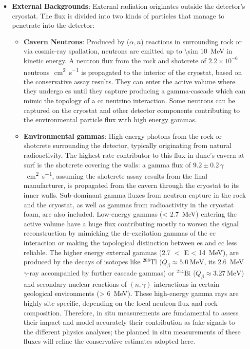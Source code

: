 \begin{itemize}
  \item\textbf{External Backgrounds}: External radiation originates outside the detector's cryostat. The flux is divided into two kinds of particles that manage to penetrate into the detector:

  \begin{itemize}
    \item\textbf{Cavern Neutrons}: Produced by (\(\alpha,n\)) reactions in surrounding rock or via cosmic-ray spallation, neutrons are emitted up to \SI{\sim 10}{\mega\electronvolt} in kinetic energy. A neutron flux from the rock and shotcrete of $2.2\times10^{-6}$\,neutrons\,\unit{\per\centi\meter\squared\per\second} is propagated to the interior of the cryostat, based on the conservative assay results. They can enter the active volume where they undergo \gls{es} until they capture producing a gamma-cascade which can mimic the topology of a \gls{cc} neutrino interaction. Some neutrons can be captured on the cryostat and other detector components contributing to the environmental particle flux with high energy gammas.
    \item\textbf{Environmental gammas}: High-energy photons from the rock or shotcrete surrounding the detector, typically originating from natural radioactivity. The highest rate contributor to this flux in \gls{dune}'s cavern at \gls{surf} is the shotcrete covering the walls: a gamma flux of $9.2\pm0.2$\,$\gamma$\,\unit{\per\centi\meter\squared\per\second}, assuming the shotcrete assay results from the final manufacturer, is propagated from the cavern through the cryostat to its inner walls. Sub-dominant gamma fluxes from neutron capture in the rock and the cryostat, as well as gammas from radioactivity in the cryostat foam, are also included. Low-energy gammas (\SI{< 2.7}{\mega\electronvolt}) entering the active volume have a huge flux contributing mostly to worsen the signal reconstruction by mimicking the de-excitation gammas of the \gls{cc} interaction or making the topological distinction between \gls{es} and \gls{cc} less reliable. The higher energy external gammas (\num{2.7} $<$ E \SI{< 14}{\mega\electronvolt}), are produced by the decays of isotopes like \(^{208}\text{Tl}\) (\(Q_\beta\approx\SI{5.0}{\mega\electronvolt}\), its \SI{2.6}{\mega\electronvolt} \(\gamma\)-ray accompanied by further cascade gammas) or \(^{214}\text{Bi}\) (\(Q_\beta\approx\SI{3.27}{\mega\electronvolt}\)) and secondary nuclear reactions of $(n,\gamma)$ interactions in certain geological environments (\SI{> 6}{\mega\electronvolt}). These high-energy gamma rays are highly site-specific, depending on the local neutron flux and rock composition. Therefore, in situ measurements are fundamental to assess their impact and model accurately their contribution as fake signals to the different physics analyses; the planned in situ measurements of these fluxes will refine the conservative estimates adopted here.
  \end{itemize}


\end{itemize}
